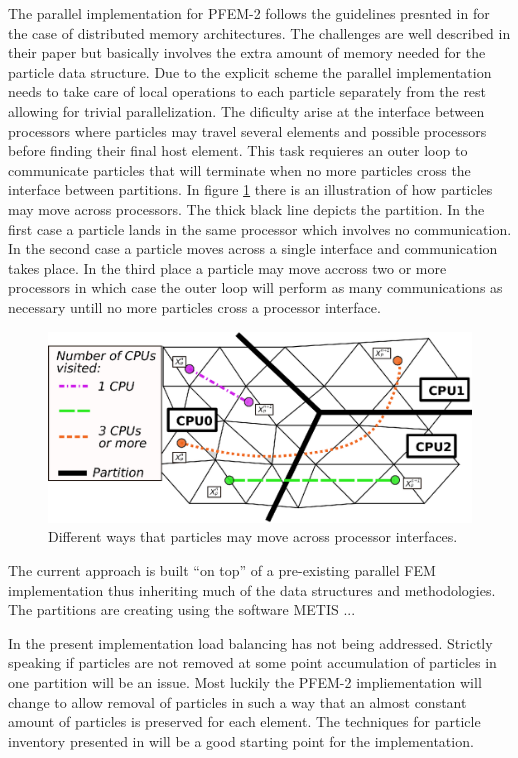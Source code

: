 The parallel implementation for PFEM-2 follows the guidelines presnted in \cite{gimenez:parallel} for the case of distributed memory architectures. The challenges are well described in their paper but basically involves the extra amount of memory needed for the particle data structure. Due to the explicit scheme the parallel implementation needs to take care of local operations to each particle separately from the rest allowing for trivial parallelization. The dificulty arise at the interface between processors where particles may travel several elements and possible processors before finding their final host element. This task requieres an outer loop to communicate particles that will terminate when no more particles cross the interface between partitions. In figure \ref{fig:parallel} there is an illustration of how particles may move across processors. The thick black line depicts the partition. In the first case a particle lands in the same processor which involves no communication. In the second case a particle moves across a single interface and communication takes place. In the third place a particle may move accross two or more processors in which case the outer loop will perform as many communications as necessary untill no more particles cross a processor interface.

\begin{figure}[htp] 
\centering 
\includegraphics[scale=.6]{./imgs/parallel.eps}
\caption{Different ways that particles may move across processor interfaces.}
\label{fig:parallel}
\end{figure}


The current approach is built ``on top'' of a pre-existing parallel FEM implementation thus inheriting much of the data structures and methodologies. The partitions are creating using the software METIS \cite{metis1,metis}...

In the present implementation load balancing has not being addressed. Strictly speaking if particles are not removed at some point accumulation of particles in one partition will be an issue. Most luckily the PFEM-2 impliementation will change to allow removal of particles in such a way that an almost constant amount of particles is preserved for each element. The techniques for particle inventory presented in \cite{gimenez-difusion} will be a good starting point for the implementation.

